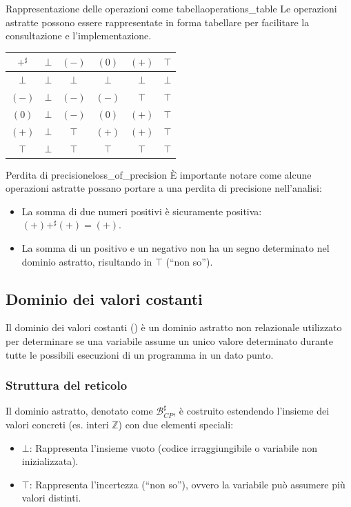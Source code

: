 \begin{nota}{Rappresentazione delle operazioni come tabella}{operations_table}
Le operazioni astratte possono essere rappresentate in forma tabellare per
facilitare la consultazione e l'implementazione.

\begin{center}
\begin{tabular}{c|ccccc}
$+^\sharp$ & $\bot$ & $(-)$ & $(0)$ & $(+)$ & $\top$ \\
\hline
$\bot$ & $\bot$ & $\bot$ & $\bot$ & $\bot$ & $\bot$ \\
$(-)$ & $\bot$ & $(-)$ & $(-)$ & $\top$ & $\top$ \\
$(0)$ & $\bot$ & $(-)$ & $(0)$ & $(+)$ & $\top$ \\
$(+)$ & $\bot$ & $\top$ & $(+)$ & $(+)$ & $\top$ \\
$\top$ & $\bot$ & $\top$ & $\top$ & $\top$ & $\top$ \\
\end{tabular}
\end{center}

\end{nota}

\begin{nota}{Perdita di precisione}{loss_of_precision}
È importante notare come alcune operazioni astratte possano portare a una
perdita di precisione nell'analisi:
\begin{itemize}
\item La somma di due numeri positivi è sicuramente positiva: $(+) +^\sharp (+) = (+)$.
\item La somma di un positivo e un negativo non ha un segno determinato nel
dominio astratto, risultando in $\top$ (``non so'').
\end{itemize}
\end{nota}

\subsection{Dominio dei valori costanti}

Il dominio dei valori costanti () è un
dominio astratto non relazionale utilizzato per determinare se una
variabile assume un unico valore determinato durante tutte le possibili
esecuzioni di un programma in un dato punto.

\subsubsection{Struttura del reticolo}
Il dominio astratto, denotato come $\mathcal{B}^\sharp_{CP}$,
è costruito estendendo l'insieme dei valori concreti (es. interi
$\mathbb{Z}$) con due elementi speciali:
\begin{itemize}
    \item $\bot$: Rappresenta l'insieme vuoto (codice irraggiungibile o
    variabile non inizializzata).
    \item $\top$: Rappresenta l'incertezza (``non so''), ovvero la
    variabile può assumere più valori distinti.
\end{itemize}

